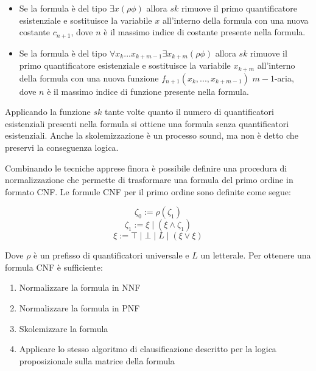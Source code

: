 \documentclass[./main.tex]{subfiles}
\begin{document}
\begin{itemize}
  \item Se la formula è del tipo $\exists x(\rho \phi)$ allora $sk$ rimuove il primo quantificatore esistenziale e sostituisce 
  la variabile $x$ all'interno della formula con una nuova costante $c_{n+1}$, dove $n$ è il massimo indice di costante presente nella formula.

  \item Se la formula è del tipo $\forall x_k ... x_{k+m-1} \exists x_{k+m} (\rho \phi)$ allora $sk$ rimuove 
  il primo quantificatore esistenziale e sostituisce la variabile $x_{k+m}$ all'interno della formula con una nuova funzione 
  $f_{n+1}(x_k, ... , x_{k+m-1})$
  $m-1$-aria, dove $n$ è il massimo indice di funzione presente nella formula.
\end{itemize}

Applicando la funzione $sk$ tante volte quanto il numero di quantificatori esistenziali presenti nella formula si ottiene una formula 
senza quantificatori esistenziali. Anche la skolemizzazione è un processo sound, ma non è detto che preservi la conseguenza logica.



Combinando le tecniche apprese finora è possibile definire una procedura di normalizzazione che permette di trasformare una formula del primo ordine
in formato CNF. Le formule CNF per il primo ordine sono definite come segue:

$$ \zeta_0 := \rho(\zeta_1) $$
$$ \zeta_1 := \xi \mid (\xi \land \zeta_1) $$
$$ \xi := \top \mid \bot \mid L \mid (\xi \lor \xi ) $$

Dove $\rho$ è un prefisso di quantificatori universale e $L$ un letterale. Per ottenere una formula CNF è sufficiente:

\begin{enumerate}
  \item Normalizzare la formula in NNF
  \item Normalizzare la formula in PNF
  \item Skolemizzare la formula
  \item Applicare lo stesso algoritmo di clausificazione descritto per la logica proposizionale sulla matrice della formula
\end{enumerate}
\end{document}

